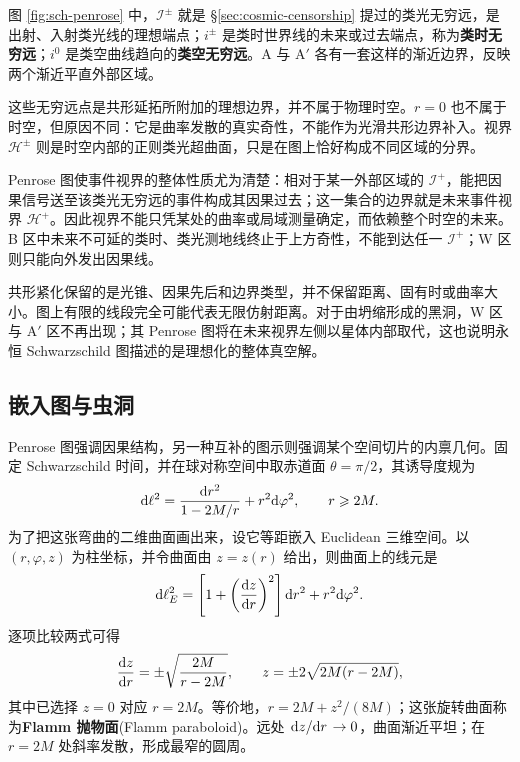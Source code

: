图 \ref{fig:sch-penrose} 中，$\mathscr I^\pm$ 就是 \S\ref{sec:cosmic-censorship} 提过的类光无穷远，是出射、入射类光线的理想端点；$i^\pm$ 是类时世界线的未来或过去端点，称为\textbf{类时无穷远}；$i^0$ 是类空曲线趋向的\textbf{类空无穷远}。A 与 A$'$ 各有一套这样的渐近边界，反映两个渐近平直外部区域。

这些无穷远点是共形延拓所附加的理想边界，并不属于物理时空。$r=0$ 也不属于时空，但原因不同：它是曲率发散的真实奇性，不能作为光滑共形边界补入。视界 $\mathcal H^\pm$ 则是时空内部的正则类光超曲面，只是在图上恰好构成不同区域的分界。

Penrose 图使事件视界的整体性质尤为清楚：相对于某一外部区域的 $\mathscr I^+$，能把因果信号送至该类光无穷远的事件构成其因果过去；这一集合的边界就是未来事件视界 $\mathcal H^+$。因此视界不能只凭某处的曲率或局域测量确定，而依赖整个时空的未来。B 区中未来不可延的类时、类光测地线终止于上方奇性，不能到达任一 $\mathscr I^+$；W 区则只能向外发出因果线。

共形紧化保留的是光锥、因果先后和边界类型，并不保留距离、固有时或曲率大小。图上有限的线段完全可能代表无限仿射距离。对于由坍缩形成的黑洞，W 区与 A$'$ 区不再出现；其 Penrose 图将在未来视界左侧以星体内部取代，这也说明永恒 Schwarzschild 图描述的是理想化的整体真空解。

\subsection{嵌入图与虫洞}

Penrose 图强调因果结构，另一种互补的图示则强调某个空间切片的内禀几何。固定 Schwarzschild 时间，并在球对称空间中取赤道面 $\theta=\pi/2$，其诱导度规为
\[
    \dd \ell^2=\frac{\dd r^2}{1-2M/r}+r^2\dd\varphi^2,
    \qquad r\geqslant 2M.
\]
为了把这张弯曲的二维曲面画出来，设它等距嵌入 Euclidean 三维空间。以 $(r,\varphi,z)$ 为柱坐标，并令曲面由 $z=z(r)$ 给出，则曲面上的线元是
\[
    \dd \ell_E^2=\left[1+\left(\dv{z}{r}\right)^2\right]\dd r^2+r^2\dd\varphi^2.
\]
逐项比较两式可得
\[
    \dv{z}{r}=\pm\sqrt{\frac{2M}{r-2M}},\qquad
    z=\pm2\sqrt{2M(r-2M)},
\]
其中已选择 $z=0$ 对应 $r=2M$。等价地，$r=2M+z^2/(8M)$；这张旋转曲面称为\textbf{Flamm 抛物面}(Flamm paraboloid)。远处 $\dv*{z}{r}\to0$，曲面渐近平坦；在 $r=2M$ 处斜率发散，形成最窄的圆周。

